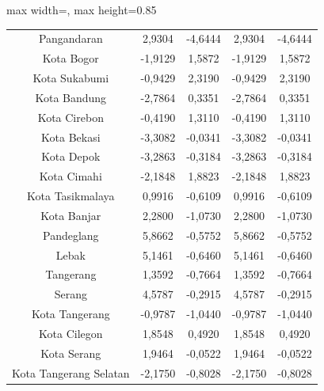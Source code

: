 \begin{table}[H]
\begin{adjustbox}{max width=\textwidth, max height=0.85\textheight}
\begin{tabular}{|c|c|c|c|c|}
Pangandaran & 2,9304 & -4,6444 & 2,9304 & -4,6444 \\
Kota Bogor & -1,9129 & 1,5872 & -1,9129 & 1,5872 \\
Kota Sukabumi & -0,9429 & 2,3190 & -0,9429 & 2,3190 \\
Kota Bandung & -2,7864 & 0,3351 & -2,7864 & 0,3351 \\
Kota Cirebon & -0,4190 & 1,3110 & -0,4190 & 1,3110 \\
Kota Bekasi & -3,3082 & -0,0341 & -3,3082 & -0,0341 \\
Kota Depok & -3,2863 & -0,3184 & -3,2863 & -0,3184 \\
Kota Cimahi & -2,1848 & 1,8823 & -2,1848 & 1,8823 \\
Kota Tasikmalaya & 0,9916 & -0,6109 & 0,9916 & -0,6109 \\
Kota Banjar & 2,2800 & -1,0730 & 2,2800 & -1,0730 \\
Pandeglang & 5,8662 & -0,5752 & 5,8662 & -0,5752 \\
Lebak & 5,1461 & -0,6460 & 5,1461 & -0,6460 \\
Tangerang & 1,3592 & -0,7664 & 1,3592 & -0,7664 \\
Serang & 4,5787 & -0,2915 & 4,5787 & -0,2915 \\
Kota Tangerang & -0,9787 & -1,0440 & -0,9787 & -1,0440 \\
Kota Cilegon & 1,8548 & 0,4920 & 1,8548 & 0,4920 \\
Kota Serang & 1,9464 & -0,0522 & 1,9464 & -0,0522 \\
Kota Tangerang Selatan & -2,1750 & -0,8028 & -2,1750 & -0,8028 \\
\hline
\end{tabular}
\end{adjustbox}
\end{table}